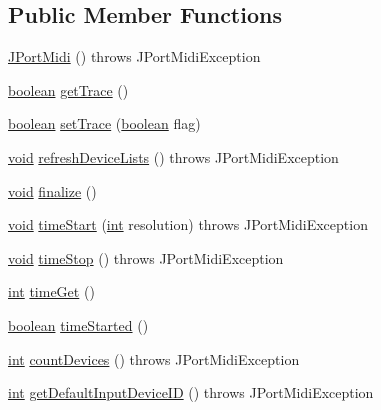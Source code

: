 \subsection*{Public Member Functions}
\begin{DoxyCompactItemize}
\item 
\hyperlink{classjportmidi_1_1_j_port_midi_a91bbeda3c13f6756440d6aa14f046277}{J\+Port\+Midi} ()  throws J\+Port\+Midi\+Exception 
\item 
\hyperlink{cext_8h_a7670a4e8a07d9ebb00411948b0bbf86d}{boolean} \hyperlink{classjportmidi_1_1_j_port_midi_a68dcaea5bdf9095a92565fb4f82cbab0}{get\+Trace} ()
\item 
\hyperlink{cext_8h_a7670a4e8a07d9ebb00411948b0bbf86d}{boolean} \hyperlink{classjportmidi_1_1_j_port_midi_ac48dc09ec6b0b55e2e90f42f37243b98}{set\+Trace} (\hyperlink{cext_8h_a7670a4e8a07d9ebb00411948b0bbf86d}{boolean} flag)
\item 
\hyperlink{sound_8c_ae35f5844602719cf66324f4de2a658b3}{void} \hyperlink{classjportmidi_1_1_j_port_midi_ac52b394ff7553bf84f6aa000439d170c}{refresh\+Device\+Lists} ()  throws J\+Port\+Midi\+Exception      
\item 
\hyperlink{sound_8c_ae35f5844602719cf66324f4de2a658b3}{void} \hyperlink{classjportmidi_1_1_j_port_midi_a8475340d338dccc0f5dbe1d10636a697}{finalize} ()
\item 
\hyperlink{sound_8c_ae35f5844602719cf66324f4de2a658b3}{void} \hyperlink{classjportmidi_1_1_j_port_midi_ab52502740614447288211e208cfc6af1}{time\+Start} (\hyperlink{xmltok_8h_a5a0d4a5641ce434f1d23533f2b2e6653}{int} resolution)  throws J\+Port\+Midi\+Exception 
\item 
\hyperlink{sound_8c_ae35f5844602719cf66324f4de2a658b3}{void} \hyperlink{classjportmidi_1_1_j_port_midi_a7bedb3cee6cba29bb29aae5e382261e0}{time\+Stop} ()  throws J\+Port\+Midi\+Exception 
\item 
\hyperlink{xmltok_8h_a5a0d4a5641ce434f1d23533f2b2e6653}{int} \hyperlink{classjportmidi_1_1_j_port_midi_ac39a03bf2aa5e641ae2157d1ecf333a4}{time\+Get} ()
\item 
\hyperlink{cext_8h_a7670a4e8a07d9ebb00411948b0bbf86d}{boolean} \hyperlink{classjportmidi_1_1_j_port_midi_a827044056144d3def46a53a0f6e52d5e}{time\+Started} ()
\item 
\hyperlink{xmltok_8h_a5a0d4a5641ce434f1d23533f2b2e6653}{int} \hyperlink{classjportmidi_1_1_j_port_midi_a95f3b9ed2ec00b3ce494ec6b7b979a35}{count\+Devices} ()  throws J\+Port\+Midi\+Exception 
\item 
\hyperlink{xmltok_8h_a5a0d4a5641ce434f1d23533f2b2e6653}{int} \hyperlink{classjportmidi_1_1_j_port_midi_ac2f92ad28c51b7b0fae842f02b4d8e03}{get\+Default\+Input\+Device\+ID} ()  throws J\+Port\+Midi\+Exception 

\end{DoxyCompactItemize}
